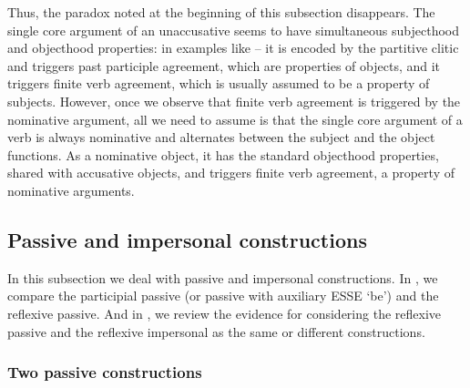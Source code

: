 \documentclass[output=paper,hidelinks]{langscibook}
\begin{document}
Thus, the paradox noted at the beginning of this subsection disappears. The single core argument of an unaccusative seems to have simultaneous subjecthood and objecthood properties: in examples like -- it is encoded by the partitive clitic and triggers past participle agreement, which are properties of objects, and it triggers finite verb agreement, which is usually assumed to be a property of subjects. However, once we observe that finite verb agreement is triggered by the nominative argument, all we need to assume is that the single core argument of a verb is always nominative and alternates between the subject and the object functions. As a nominative object, it has the standard objecthood properties, shared with accusative objects, and triggers finite verb agreement, a property of nominative arguments.

\subsection{Passive and impersonal constructions}
\label{sec:Romance:3.2}

In this subsection we deal with passive and impersonal constructions. In , we compare the participial passive (or passive with auxiliary ESSE `be') and the reflexive passive. And in , we review the evidence for considering the reflexive passive and the reflexive impersonal as the same or different constructions. 

\subsubsection{Two passive constructions}
\label{sec:Romance:3.2.1}
\end{document}
